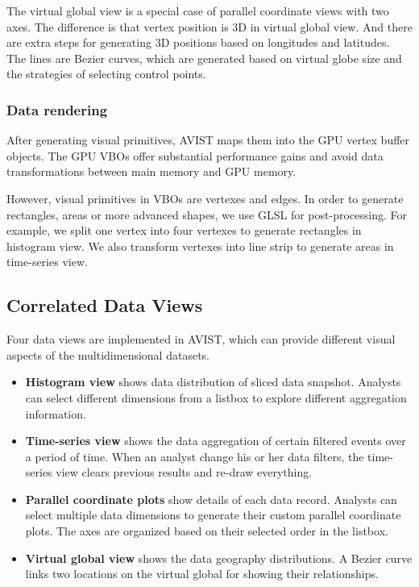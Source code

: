 The virtual global view is a special case of parallel coordinate views with two axes. The difference is that vertex position is 3D in virtual global view. And there are extra steps for generating 3D positions based on longitudes and latitudes. 
The lines are Bezier curves, which are generated based on virtual globe size and the strategies of selecting control points.


\subsubsection{Data rendering}
After generating visual primitives, AVIST maps them into the GPU vertex buffer objects. The  GPU VBOs offer substantial performance gains and avoid data transformations between main memory and GPU memory.

However,  visual primitives in VBOs are vertexes and edges. In order to  generate rectangles, areas or more advanced shapes, we use GLSL for post-processing. For example, we split one vertex into four vertexes to generate rectangles in histogram view. We also transform vertexes into line strip to generate areas in time-series view.


\subsection{Correlated Data Views}
Four data views are implemented in AVIST, which can provide different visual aspects of the multidimensional datasets.

\begin{itemize}
	
	
	\item \textbf{Histogram view} shows  data distribution of  sliced data snapshot. Analysts can select different dimensions  from a listbox to explore different aggregation information.
	
	\item \textbf{Time-series view} shows the data aggregation of certain filtered events over a period of time. When an analyst change his or her data filters, the time-series view clears previous results and re-draw everything. 
	
	\item \textbf{Parallel coordinate plots} show  details of each data record. Analysts can select multiple data dimensions to generate their custom parallel coordinate plots. The axes are organized based on their selected order in the listbox.
	
	\item \textbf{Virtual global view} shows the data geography distributions.  A Bezier curve links two locations on the virtual global for showing their  relationships.
	
\end{itemize}

